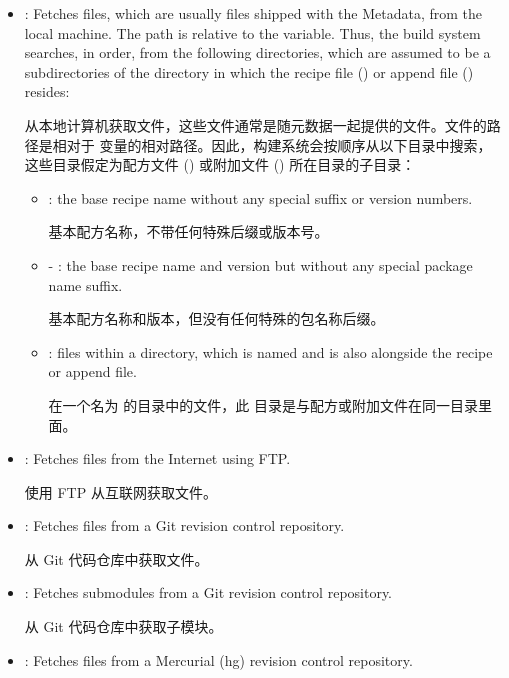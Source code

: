 {\begin{itemize}
\item {}: Fetches files, which are usually files shipped with the Metadata, from the local machine. The path is relative to the  variable. Thus, the build system searches, in order, from the following directories, which are assumed to be a subdirectories of the directory in which the recipe file () or append file () resides:

\medskip
从本地计算机获取文件，这些文件通常是随元数据一起提供的文件。文件的路径是相对于  变量的相对路径。因此，构建系统会按顺序从以下目录中搜索，这些目录假定为配方文件 () 或附加文件 () 所在目录的子目录：

\medskip
\begin{itemize}
\setlength\itemsep{1.0em}
\item {}: the base recipe name without any special suffix or version numbers.

\medskip
基本配方名称，不带任何特殊后缀或版本号。

\item {} - : the base recipe name and version but without any special package name suffix.

\medskip
基本配方名称和版本，但没有任何特殊的包名称后缀。

\item {}: files within a directory, which is named  and is also alongside the recipe or append file.

\medskip
在一个名为  的目录中的文件，此  目录是与配方或附加文件在同一目录里面。
\end{itemize}

\item {}: Fetches files from the Internet using FTP.

\medskip
使用 FTP 从互联网获取文件。

\item {}: Fetches files from a Git revision control repository.

\medskip
从 Git 代码仓库中获取文件。

\item {}: Fetches submodules from a Git revision control repository.

\medskip
从 Git 代码仓库中获取子模块。

\item {}: Fetches files from a Mercurial (hg) revision control repository.


\end{itemize}}
